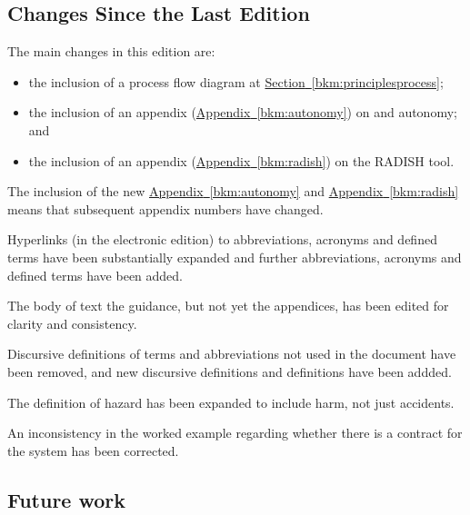 \subsection*{Changes Since the Last Edition}%
\cbstart The main changes in this edition are:
\begin{itemize}
\item the inclusion of a process flow diagram at \hyperref[bkm:principlesprocess]{{Section}~\ref{bkm:principlesprocess}};
\item the inclusion of an appendix (\hyperref[bkm:autonomy]{{Appendix}~\ref{bkm:autonomy}}) on  and autonomy; and
\item the inclusion of an appendix (\hyperref[bkm:radish]{{Appendix}~\ref{bkm:radish}}) on the RADISH tool.
\end{itemize}
The inclusion of the new \hyperref[bkm:autonomy]{{Appendix}~\ref{bkm:autonomy}} and \hyperref[bkm:radish]{{Appendix}~\ref{bkm:radish}} means that subsequent appendix numbers have changed.

Hyperlinks (in the electronic edition) to abbreviations, acronyms and defined terms have been substantially expanded and further abbreviations, acronyms and defined terms have been added.

The body of text the guidance, but not yet the appendices, has been edited for clarity and consistency.

Discursive definitions of terms and abbreviations not used in the document have been removed, and new discursive definitions and definitions have been addded.

The definition of hazard has been expanded to include harm, not just accidents.

An inconsistency in the worked example regarding whether there is a contract for the system has been corrected.

\subsection*{Future work}

